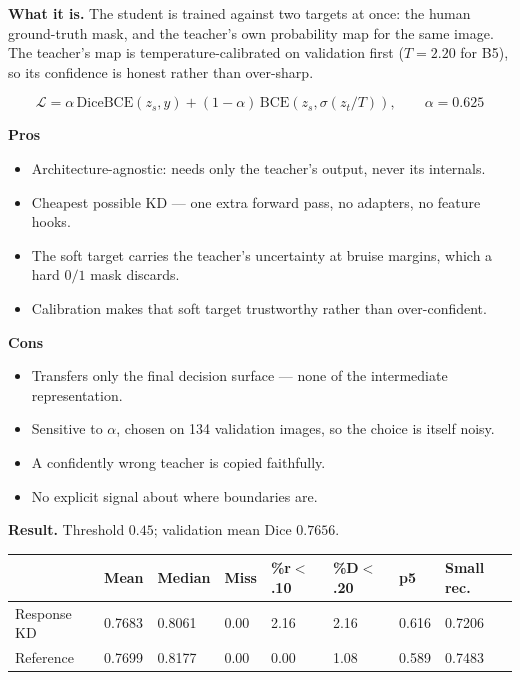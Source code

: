 \documentclass[11pt]{article}
\newcommand{\pro}[1]{\item[\textcolor{proscol}{$+$}] #1}
\newcommand{\con}[1]{\item[\textcolor{conscol}{$-$}] #1}
\begin{document}
\textbf{What it is.} The student is trained against two targets at once: the human ground-truth
mask, and the teacher's own probability map for the same image. The teacher's map is
temperature-calibrated on validation first ($T=2.20$ for B5), so its confidence is honest rather
than over-sharp.

\[
  \mathcal{L}=\alpha\,\mathrm{DiceBCE}(z_s,y)+(1-\alpha)\,\mathrm{BCE}(z_s,\sigma(z_t/T)),
  \qquad \alpha=0.625
\]

\begin{minipage}[t]{0.475\textwidth}
\textbf{\textcolor{proscol}{Pros}}
\begin{itemize}[leftmargin=1.5em,itemsep=1pt,label={},labelwidth=1em,labelsep=0.4em,align=left]
  \pro{Architecture-agnostic: needs only the teacher's output, never its internals.}
  \pro{Cheapest possible KD --- one extra forward pass, no adapters, no feature hooks.}
  \pro{The soft target carries the teacher's uncertainty at bruise margins, which a hard $0/1$
       mask discards.}
  \pro{Calibration makes that soft target trustworthy rather than over-confident.}
\end{itemize}
\end{minipage}\hfill%
\begin{minipage}[t]{0.475\textwidth}
\textbf{\textcolor{conscol}{Cons}}
\begin{itemize}[leftmargin=1.5em,itemsep=1pt,label={},labelwidth=1em,labelsep=0.4em,align=left]
  \con{Transfers only the final decision surface --- none of the intermediate representation.}
  \con{Sensitive to $\alpha$, chosen on 134 validation images, so the choice is itself noisy.}
  \con{A confidently wrong teacher is copied faithfully.}
  \con{No explicit signal about where boundaries are.}
\end{itemize}
\end{minipage}

\vspace{6pt}
\textbf{Result.} Threshold $0.45$; validation mean Dice $0.7656$.

\begin{center}\small
\begin{tabular}{K q q q q q q M}
\toprule
& \textbf{Mean} & \textbf{Median} & \textbf{Miss} & \textbf{\%r$<$.10} & \textbf{\%D$<$.20} &
\textbf{p5} & \textbf{Small rec.} \\
\midrule
Response KD & 0.7683 & 0.8061 & 0.00 & 2.16 & 2.16 & 0.616 & 0.7206 \\
Reference   & 0.7699 & 0.8177 & 0.00 & 0.00 & 1.08 & 0.589 & 0.7483 \\
\bottomrule
\end{tabular}
\end{center}
\end{document}
